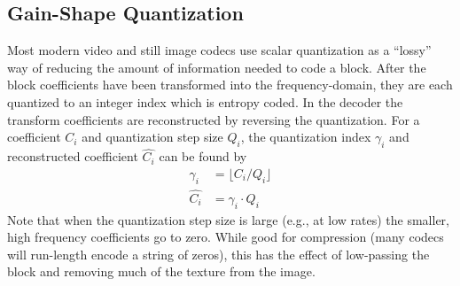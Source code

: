 \documentclass[conference, 10pt]{IEEEtran}
\begin{document}

%
%
%
%
%
%

\subsection{Gain-Shape Quantization}
\label{sec:pvq}

Most modern video and still image codecs use scalar quantization as a ``lossy''
 way of reducing the amount of information needed to code a block.
After the block coefficients have been transformed into the frequency-domain,
 they are each quantized to an integer index which is entropy coded.
In the decoder the transform coefficients are reconstructed by reversing the
 quantization.
For a coefficient $C_i$ and quantization step size $Q_i$, the quantization
 index $\gamma_i$ and reconstructed coefficient $\hat{C_i}$ can be found by
\begin{align}
\gamma_i & = \lfloor C_i / Q_i\rfloor \\
\hat{C_i} & = \gamma_i\cdot Q_i
\end{align}
Note that when the quantization step size is large (e.g., at low rates) the
 smaller, high frequency coefficients go to zero.
While good for compression (many codecs will run-length encode a string of
 zeros), this has the effect of low-passing the block and removing much of the
 texture from the image.
\end{document}
